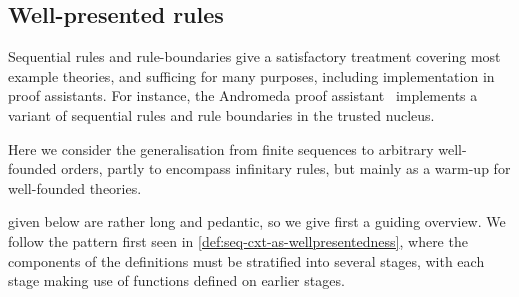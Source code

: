 \subsection{Well-presented rules}
\label{sec:well-presented-rules}

Sequential rules and rule-boundaries give a satisfactory treatment covering most example theories, and sufficing for many purposes, including implementation in proof assistants.
%
For instance, the Andromeda proof assistant~\citep{andromeda,bauer19} implements a variant of sequential rules and rule boundaries in the trusted nucleus.

Here we consider the generalisation from finite sequences to arbitrary well-founded orders, partly to encompass infinitary rules, but mainly as a warm-up for well-founded theories.

 given below are rather long and pedantic, so we give first a guiding overview.
%
We follow the pattern first seen in \cref{def:seq-cxt-as-wellpresentedness}, where the components of the definitions must be stratified into several stages, with each stage making use of functions defined on earlier stages.

